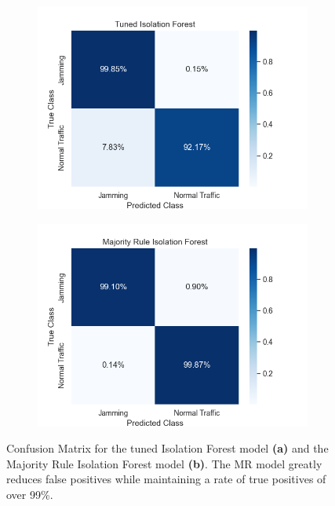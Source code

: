 \documentclass[futureinternet,article,submit,pdftex,moreauthors]{Definitions/mdpi}
\begin{document}
\begin{figure}[H]
	\centering
	\begin{subfigure}{0.49\textwidth}
		\centering
		\includegraphics[width=\textwidth]{img/ConfusionMatrixTunedIF.png}
		\caption{}
		\label{fig:ConfusionMatrixStandardTunedIF1}
	\end{subfigure}
	\hfill
	\begin{subfigure}{0.49\textwidth}
		\centering
		\includegraphics[width=\textwidth]{img/ConfusionMatrixMajorityIF.png}
		\caption{}
		\label{fig:ConfusionMatrixMajorityIF}
	\end{subfigure}
	\caption{Confusion Matrix for the tuned Isolation Forest model \textbf{(a)} and the Majority Rule Isolation Forest model \textbf{(b)}. The MR model greatly reduces false positives while maintaining a rate of true positives of over 99\%.}
	\label{fig:ConfusionMatrixTunedMajorityIF}
\end{figure}
\end{document}
